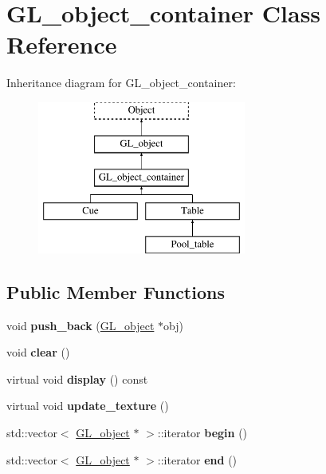 \hypertarget{class_g_l__object__container}{
\section{GL\_\-object\_\-container Class Reference}
\label{class_g_l__object__container}
}
Inheritance diagram for GL\_\-object\_\-container:\begin{figure}[H]
\begin{center}
\leavevmode
\includegraphics[height=5.000000cm]{class_g_l__object__container}
\end{center}
\end{figure}
\subsection*{Public Member Functions}
\begin{DoxyCompactItemize}
\item 
\hypertarget{class_g_l__object__container_a475e2e765ba56182f02b31e3362741b7}{
void {\bfseries push\_\-back} (\hyperlink{class_g_l__object}{GL\_\-object} $\ast$obj)}
\label{class_g_l__object__container_a475e2e765ba56182f02b31e3362741b7}

\item 
\hypertarget{class_g_l__object__container_a8fbfc412beb7133939dc007e6d9d0228}{
void {\bfseries clear} ()}
\label{class_g_l__object__container_a8fbfc412beb7133939dc007e6d9d0228}

\item 
\hypertarget{class_g_l__object__container_a8f2d84148ad253e4c680137794fafbea}{
virtual void {\bfseries display} () const }
\label{class_g_l__object__container_a8f2d84148ad253e4c680137794fafbea}

\item 
\hypertarget{class_g_l__object__container_ac7c9d34bca008e1371acdf9684b5e9e6}{
virtual void {\bfseries update\_\-texture} ()}
\label{class_g_l__object__container_ac7c9d34bca008e1371acdf9684b5e9e6}

\item 
\hypertarget{class_g_l__object__container_a3f829013a7e349b4f0bc41fe7cacd17d}{
std::vector$<$ \hyperlink{class_g_l__object}{GL\_\-object} $\ast$ $>$::iterator {\bfseries begin} ()}
\label{class_g_l__object__container_a3f829013a7e349b4f0bc41fe7cacd17d}

\item 
\hypertarget{class_g_l__object__container_aacc6c10d7417df98ffb49929efd0f17a}{
std::vector$<$ \hyperlink{class_g_l__object}{GL\_\-object} $\ast$ $>$::iterator {\bfseries end} ()}
\label{class_g_l__object__container_aacc6c10d7417df98ffb49929efd0f17a}

\end{DoxyCompactItemize}
